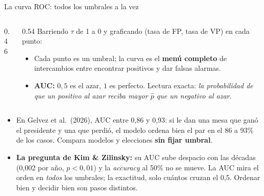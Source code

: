\documentclass{beamer}
\newcommand{\1}{\mathbb{I}}
\begin{document}
\begin{frame}{La curva ROC: todos los umbrales a la vez}
\small
\begin{columns}[T]
\begin{column}{0.46\textwidth}
\begin{center}
\end{center}
\end{column}
\begin{column}{0.54\textwidth}
\vspace{0.05cm}
Barriendo $\tau$ de 1 a 0 y graficando (tasa de FP, tasa de VP) en cada punto:
\begin{itemize}\itemsep3pt
  \item Cada punto es un umbral; la curva es el \textbf{menú completo} de intercambios entre encontrar positivos y dar falsas alarmas.
  \item \textbf{AUC:} $0{,}5$ es el azar, $1$ es perfecto. Lectura exacta: \emph{la probabilidad de que un positivo al azar reciba mayor $\hat{p}$ que un negativo al azar}.
\end{itemize}
\end{column}
\end{columns}
\pause
\vspace{0.1cm}
\begin{itemize}\itemsep3pt
  \item En Gelvez et al.\ (2026), AUC entre 0,86 y 0,93: si le dan una mesa que ganó el presidente y una que perdió, el modelo ordena bien el par en el 86 a 93\% de los casos. Compara modelos y elecciones \textbf{sin fijar umbral}.
  \item \textbf{La pregunta de Kim \& Zilinsky:} su AUC sube despacio con las décadas (0,002 por año, $p < 0{,}01$) y la \emph{accuracy} al 50\% no se mueve. La AUC mira el orden en \emph{todos} los umbrales; la exactitud, solo cuántos cruzan el 0,5. Ordenar bien y decidir bien son pasos distintos.
\end{itemize}
\end{frame}
\end{document}
